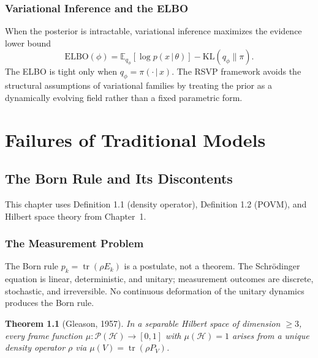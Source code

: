 \documentclass[11pt, openright, twoside]{book}
\theoremstyle{plain}
\newtheorem{theorem}{Theorem}[chapter]
\theoremstyle{definition}
\theoremstyle{remark}
\newcommand{\given}{\,|\,}
\begin{document}
\section{Variational Inference and the ELBO}

When the posterior is intractable, variational inference maximizes the evidence lower bound
\begin{equation}
  \mathrm{ELBO}(\phi) = \mathbb{E}_{q_\phi}[\log p(x\given\theta)] - \mathrm{KL}(q_\phi\|\pi).
  \label{eq:elbo}
\end{equation}
The ELBO is tight only when $q_\phi = \pi(\cdot\given x)$. The RSVP framework avoids the
structural assumptions of variational families by treating the prior as a dynamically
evolving field rather than a fixed parametric form.

\part{Failures of Traditional Models}

\chapter{The Born Rule and Its Discontents}

\begin{depbox}
This chapter uses Definition 1.1 (density operator), Definition 1.2 (POVM), and
Hilbert space theory from Chapter~1.
\end{depbox}

\section{The Measurement Problem}

The Born rule $p_k = \operatorname{tr}(\rho E_k)$ is a postulate, not a theorem. The
Schr\"{o}dinger equation is linear, deterministic, and unitary; measurement outcomes are
discrete, stochastic, and irreversible. No continuous deformation of the unitary dynamics
produces the Born rule.

\begin{theorem}[Gleason, 1957]
In a separable Hilbert space of dimension $\geq 3$, every frame function
$\mu:\mathcal{P}(\mathcal{H})\to[0,1]$ with $\mu(\mathcal{H})=1$ arises from a unique
density operator $\rho$ via $\mu(V)=\operatorname{tr}(\rho P_V)$.
\end{theorem}
\end{document}
